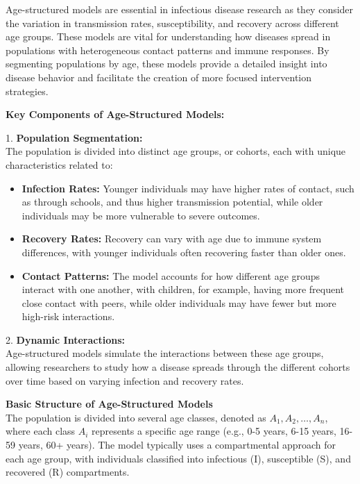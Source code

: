 \documentclass[9 pt]{article} %
\begin{document}
Age-structured models \cite{diekmann2013mathematical} are essential in infectious disease research as they consider the variation in transmission rates, susceptibility, and recovery across different age groups. These models are vital for understanding how diseases spread in populations with heterogeneous contact patterns and immune responses. By segmenting populations by age, these models provide a detailed insight into disease behavior and facilitate the creation of more focused intervention strategies.

\textbf{Key Components of Age-Structured Models:}

1. \textbf{Population Segmentation:} \\
   The population is divided into distinct age groups, or cohorts, each with unique characteristics related to:
   \begin{itemize}
       \item \textbf{Infection Rates:} Younger individuals may have higher rates of contact, such as through schools, and thus higher transmission potential, while older individuals may be more vulnerable to severe outcomes.
       \item \textbf{Recovery Rates:} Recovery can vary with age due to immune system differences, with younger individuals often recovering faster than older ones.
       \item \textbf{Contact Patterns:} The model accounts for how different age groups interact with one another, with children, for example, having more frequent close contact with peers, while older individuals may have fewer but more high-risk interactions.
   \end{itemize}

2. \textbf{Dynamic Interactions:} \\
   Age-structured models simulate the interactions between these age groups, allowing researchers to study how a disease spreads through the different cohorts over time based on varying infection and recovery rates.

\textbf{Basic Structure of Age-Structured Models} \\
The population is divided into several age classes, denoted as \( A_1, A_2, \ldots, A_n \), where each class \( A_i \) represents a specific age range (e.g., 0-5 years, 6-15 years, 16-59 years, 60+ years). The model typically uses a compartmental approach for each age group, with individuals classified into infectious (I), susceptible (S), and recovered (R) compartments.
\end{document}
